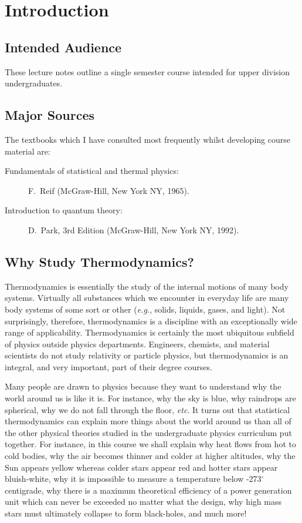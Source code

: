 \chapter{Introduction}
\section{Intended Audience}
These lecture notes outline a single semester course intended for upper
division undergraduates.

\section{Major Sources}
The textbooks which I have consulted most frequently whilst developing
course material are:
\begin{description}
\item [{\sf Fundamentals of statistical and thermal physics:}] F.~Reif
(McGraw-Hill, New York NY, 1965).
\item [{\sf Introduction to quantum theory:}] D.~Park, 3rd Edition (McGraw-Hill, New York NY, 1992).
\end{description}

\section{Why Study Thermodynamics?}
 Thermodynamics is 
essentially the study  of the internal motions of many body systems. 
Virtually all substances which we encounter in everyday life
 are many body systems of some sort or other ({\em e.g.}, solids, liquids, gases, and light).
Not surprisingly, therefore,
thermodynamics is a discipline with an exceptionally wide range
of applicability. 
Thermodynamics
is certainly the most ubiquitous subfield of physics outside
physics departments. 
Engineers, chemists, and material scientists do not study relativity
or particle physics,
but thermodynamics is an integral, and very important, part of their degree courses. 

Many people are drawn to physics because they want to understand why the
world around us is like it is. For instance, why the sky is blue, why raindrops
are spherical, why we do not fall through the floor, {\em etc}. It turns
out that 
statistical thermodynamics
can explain more things about the world around us than all of the other 
physical theories studied in
the undergraduate 
physics curriculum put together. For instance, in this course we shall explain 
why heat flows from hot to cold bodies, why the air becomes thinner and
colder at higher altitudes,
why the Sun appears yellow 
whereas colder 
stars appear red and hotter stars appear bluish-white, why it is impossible to
measure
a temperature below -273$^\circ$ centigrade, why there is a maximum theoretical
efficiency of a power generation unit which can never be exceeded no matter
what the design, why high mass stars must ultimately collapse
to form black-holes, and much more!

